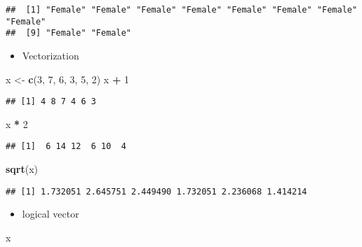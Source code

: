 \documentclass[
  a4paper,
]{article}
\newenvironment{Shaded}{\begin{snugshade}}{\end{snugshade}}
\newcommand{\DecValTok}[1]{\textcolor[rgb]{0.00,0.00,0.81}{#1}}
\newcommand{\FunctionTok}[1]{\textcolor[rgb]{0.13,0.29,0.53}{\textbf{#1}}}
\newcommand{\NormalTok}[1]{#1}
\newcommand{\OtherTok}[1]{\textcolor[rgb]{0.56,0.35,0.01}{#1}}
\newcommand{\SpecialCharTok}[1]{\textcolor[rgb]{0.81,0.36,0.00}{\textbf{#1}}}
\providecommand{\tightlist}{%
  \setlength{\itemsep}{0pt}\setlength{\parskip}{0pt}}
\begin{document}
\begin{verbatim}
##  [1] "Female" "Female" "Female" "Female" "Female" "Female" "Female" "Female"
##  [9] "Female" "Female"
\end{verbatim}

\begin{itemize}
\tightlist
\item
  Vectorization
\end{itemize}

\begin{Shaded}
\begin{Highlighting}[]
\NormalTok{x }\OtherTok{\textless{}{-}} \FunctionTok{c}\NormalTok{(}\DecValTok{3}\NormalTok{, }\DecValTok{7}\NormalTok{, }\DecValTok{6}\NormalTok{, }\DecValTok{3}\NormalTok{, }\DecValTok{5}\NormalTok{, }\DecValTok{2}\NormalTok{)}
\NormalTok{x }\SpecialCharTok{+} \DecValTok{1}
\end{Highlighting}
\end{Shaded}

\begin{verbatim}
## [1] 4 8 7 4 6 3
\end{verbatim}

\begin{Shaded}
\begin{Highlighting}[]
\NormalTok{x }\SpecialCharTok{*} \DecValTok{2}
\end{Highlighting}
\end{Shaded}

\begin{verbatim}
## [1]  6 14 12  6 10  4
\end{verbatim}

\begin{Shaded}
\begin{Highlighting}[]
\FunctionTok{sqrt}\NormalTok{(x)}
\end{Highlighting}
\end{Shaded}

\begin{verbatim}
## [1] 1.732051 2.645751 2.449490 1.732051 2.236068 1.414214
\end{verbatim}

\begin{itemize}
\tightlist
\item
  logical vector
\end{itemize}

\begin{Shaded}
\begin{Highlighting}[]
\NormalTok{x}
\end{Highlighting}
\end{Shaded}
\end{document}
